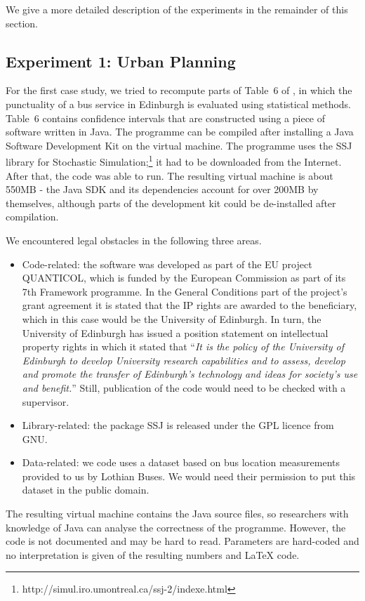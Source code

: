 We give a more detailed description of the experiments in the remainder of this section.

\subsection*{Experiment 1: Urban Planning}

For the first case study, we tried to recompute parts of Table~6 of \cite{danielpaper}, in which the punctuality of a bus service in Edinburgh is evaluated using statistical methods. Table~6 contains confidence intervals that are constructed using a piece of software written in Java. The programme can be compiled after installing a Java Software Development Kit on the virtual machine. The programme uses the SSJ library for Stochastic Simulation;\footnote{http://simul.iro.umontreal.ca/ssj-2/indexe.html} it had to be downloaded from the Internet. After that, the code was able to run.
The resulting virtual machine is about 550MB - the Java SDK and its dependencies account for over 200MB by themselves, although parts of the development kit could be de-installed after compilation.

We encountered legal obstacles in the following three areas.
\begin{itemize} 
\item Code-related: the software was developed as part of the EU project QUANTICOL, which is funded by the European Commission as part of its 7th Framework programme. In the General Conditions part of the project's grant agreement it is stated that the IP rights are awarded to the beneficiary, which in this case would be the University of Edinburgh. In turn, the University of Edinburgh has issued a position statement on intellectual property rights in which it stated that ``\emph{It is the policy of the University of Edinburgh to develop University research capabilities and to assess, develop and promote the transfer of Edinburgh's technology and ideas for society's use and benefit.}'' Still, publication of the code would need to be checked with a supervisor.
\item Library-related: the package SSJ is released under the GPL licence from GNU.
\item Data-related: we code uses a dataset based on bus location measurements provided to us by Lothian Buses. We would need their permission to put this dataset in the public domain.
\end{itemize}

The resulting virtual machine contains the Java source files, so researchers with knowledge of Java can analyse the correctness of the programme. However, the code is not documented and may be hard to read. Parameters are hard-coded and no interpretation is given of the resulting numbers and LaTeX code.

